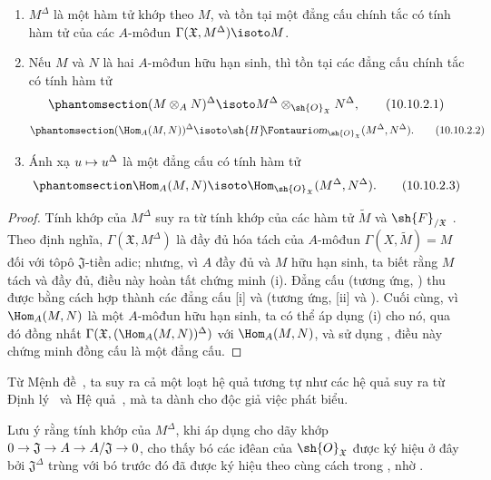 \documentclass[oneside]{amsart}
\makeatletter
\newcommand{\ega@arrow}[2]{\mathchoice{#1}{#2}{#2}{#2}}
\let\ega@shortmapsto\mapsto
\renewcommand{\to}{\ega@arrow{\longrightarrow}{\rightarrow}}
\renewcommand{\mapsto}{\ega@arrow{\longmapsto}{\ega@shortmapsto}}
\newcommand*{\ega@sheafop}[3]{\sh{#1}#2\textup{\kern-2.2pt{\Fontauri\slshape #3}}}
\newcommand*{\shHom}{\ega@sheafop{H}{}{om}}
\newcommand{\oldpage}[2][]{{\marginnote{\normalfont\textbf{#1}~|~#2}}\ignorespaces}
\let\EGAOriginalLabel\label
\renewcommand{\label}[1]{\phantomsection\EGAOriginalLabel{#1}}
\makeatother
\begin{document}
\begin{proposition}[10.10.2]
\label{I.10.10.2}
\medskip\noindent
\begin{enumerate}
  \item[\rm{(i)}] $M^\Delta$ là một hàm tử khớp theo $M$, và tồn tại một đẳng cấu chính tắc có tính hàm tử của các $A$-môđun $\Gamma(\mathfrak{X},M^\Delta)\isoto M$.
  \item[\rm{(ii)}] Nếu $M$ và $N$ là hai $A$-môđun hữu hạn sinh, thì tồn tại các đẳng cấu chính tắc có tính hàm tử
    \[
    \label{I.10.10.2.1}
      (M\otimes_A N)^\Delta\isoto M^\Delta\otimes_{\sh{O}_\mathfrak{X}}N^\Delta,
      \tag{10.10.2.1}
    \]
    \[
    \label{I.10.10.2.2}
      (\Hom_A(M,N))^\Delta\isoto\shHom_{\sh{O}_\mathfrak{X}}(M^\Delta,N^\Delta).
      \tag{10.10.2.2}
    \]
  \item[\rm{(iii)}] Ánh xạ $u\mapsto u^\Delta$ là một đẳng cấu có tính hàm tử
    \[
    \label{I.10.10.2.3}
      \Hom_A(M,N)\isoto\Hom_{\sh{O}_\mathfrak{X}}(M^\Delta,N^\Delta).
      \tag{10.10.2.3}
    \]
\end{enumerate}
\end{proposition}

\begin{proof}
Tính khớp của $M^\Delta$ suy ra từ tính khớp của các hàm tử $\widetilde{M}$  và $\sh{F}_{/\mathfrak{X}}$ .
Theo định nghĩa, $\Gamma(\mathfrak{X},M^\Delta)$ là đầy đủ hóa tách của $A$-môđun $\Gamma(X,\widetilde{M})=M$ đối với tôpô $\mathfrak{J}$-tiền adic; nhưng, vì $A$ đầy đủ và $M$ hữu hạn sinh, ta biết  rằng $M$ tách và đầy đủ, điều này hoàn tất chứng minh (i).
Đẳng cấu  (tương ứng, ) thu được bằng cách hợp thành các đẳng cấu [i] và  (tương ứng, [ii] và ).
Cuối cùng, vì $\Hom_A(M,N)$ là một $A$-môđun hữu hạn sinh, ta có thể áp dụng (i) cho nó, qua đó đồng nhất $\Gamma(\mathfrak{X},(\Hom_A(M,N))^\Delta)$ với $\Hom_A(M,N)$, và sử dụng , điều này chứng minh đồng cấu  là một đẳng cấu.
\end{proof}

Từ Mệnh đề~, ta suy ra cả một loạt hệ quả tương tự như các hệ quả suy ra từ Định lý~ và Hệ quả~, mà ta dành cho độc giả việc phát biểu.

\oldpage[I]{202}
Lưu ý rằng tính khớp của $M^\Delta$, khi áp dụng cho dãy khớp $0\to\mathfrak{J}\to A\to A/\mathfrak{J}\to 0$, cho thấy bó các iđêan của $\sh{O}_\mathfrak{X}$ được ký hiệu ở đây bởi $\mathfrak{J}^\Delta$ trùng với bó trước đó đã được ký hiệu theo cùng cách trong , nhờ .
\end{document}

